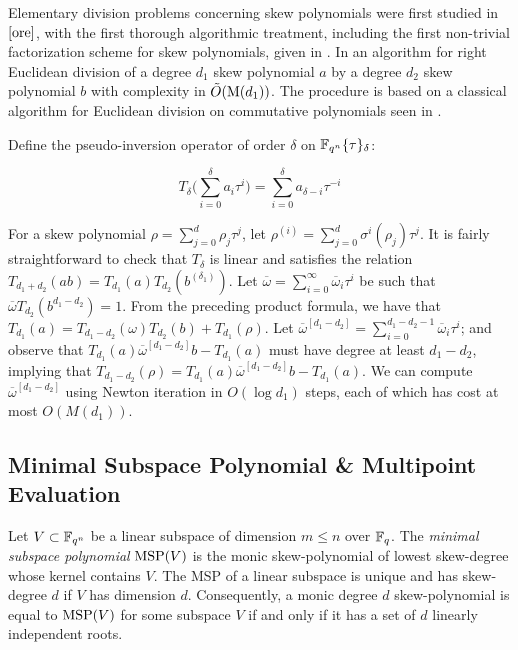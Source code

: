 Elementary division problems concerning skew polynomials were first studied in $\cite{ore}$, with the first thorough algorithmic treatment, including the first non-trivial factorization scheme for skew polynomials, given in \cite{GIESBRECHT1998463}. In \cite{CaLe17} an algorithm for right Euclidean division of a degree $d_1$ skew polynomial $a$ by a degree $d_2$ skew polynomial $b$ with complexity in $\tilde{O}(\textnormal{M}(d_1))$. The procedure is based on a classical algorithm for Euclidean division on commutative polynomials seen in \cite{Gathen:2003:MCA:945759}. 

Define the pseudo-inversion operator of order $\delta$ on $\mathbb{F}_{q^n}\{\tau\}_{\delta}$:

\begin{equation}
    T_{\delta}\bigg(\sum_{i=0}^{\delta} a_i \tau^i \bigg) = \sum_{i=0}^{\delta} a_{\delta - i} \tau^{-i}
\end{equation}

For a skew polynomial $\rho = \sum_{j=0}^{d}\rho_j\tau^j$, let $\rho^{(i)} = \sum_{j=0}^{d}\sigma^i(\rho_j)\tau^j$. It is fairly straightforward to check that $T_{\delta}$ is linear and satisfies the relation $T_{d_1 + d_2}(ab) = T_{d_1}(a)T_{d_2}(b^{(\delta_1)})$. Let $\overline{\omega} = \sum_{i=0}^{\infty} \overline{\omega}_i\tau^i$ be such that $\overline{\omega}T_{d_2}(b^{d_1 - d_2}) = 1$. From the preceding product formula, we have that $T_{d_1}(a) = T_{d_1 - d_2}(\omega)T_{d_2}(b) + T_{d_1}(\rho)$. Let $\overline{\omega}^{[d_1 - d_2]} = \sum_{i=0}^{d_1 - d_2 - 1} \overline{\omega}_i\tau^i$; and observe that $T_{d_1}(a)\overline{\omega}^{[d_1 - d_2]} b - T_{d_1}(a)$ must have degree at least $d_1 - d_2$, implying that $T_{d_1 - d_2}(\rho) = T_{d_1}(a)\overline{\omega}^{[d_1 - d_2]} b - T_{d_1}(a)$. We can compute $\overline{\omega}^{[d_1 - d_2]}$ using Newton iteration in $O(\log d_1)$ steps, each of which has cost at most $O(M(d_1))$.


\subsection{Minimal Subspace Polynomial \& Multipoint Evaluation}

Let $V \subset \mathbb{F}_{q^n}$ be a linear subspace of dimension $m \leq n$ over $\mathbb{F}_q$. The \textit{minimal subspace polynomial} $\textnormal{MSP}(V)$ is the monic skew-polynomial of lowest skew-degree whose kernel contains $V$. The MSP of a linear subspace is unique and has skew-degree $d$ if $V$ has dimension $d$. Consequently, a monic degree $d$ skew-polynomial is equal to $\textnormal{MSP}(V)$ for some subspace $V$ if and only if it has a set of $d$ linearly independent roots. 

